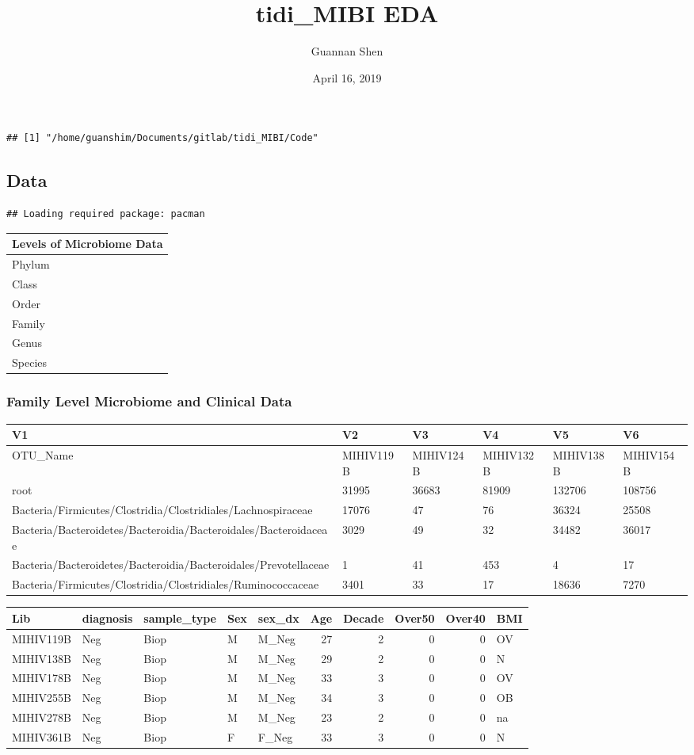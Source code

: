 \documentclass[]{article}
\title{tidi\_MIBI EDA}
\author{Guannan Shen}
\date{April 16, 2019}
\begin{document}
\maketitle

{
\setcounter{tocdepth}{5}
\tableofcontents
}
\begin{verbatim}
## [1] "/home/guanshim/Documents/gitlab/tidi_MIBI/Code"
\end{verbatim}

\subsection{Data}\label{data}

\begin{verbatim}
## Loading required package: pacman
\end{verbatim}

\begin{longtable}[]{@{}l@{}}
\toprule
Levels of Microbiome Data\tabularnewline
\midrule
\endhead
Phylum\tabularnewline
Class\tabularnewline
Order\tabularnewline
Family\tabularnewline
Genus\tabularnewline
Species\tabularnewline
\bottomrule
\end{longtable}

\subsubsection{Family Level Microbiome and Clinical
Data}\label{family-level-microbiome-and-clinical-data}

\begin{longtable}[]{@{}llllll@{}}
\toprule
V1 & V2 & V3 & V4 & V5 & V6\tabularnewline
\midrule
\endhead
OTU\_Name & MIHIV119B & MIHIV124B & MIHIV132B & MIHIV138B &
MIHIV154B\tabularnewline
root & 31995 & 36683 & 81909 & 132706 & 108756\tabularnewline
Bacteria/Firmicutes/Clostridia/Clostridiales/Lachnospiraceae & 17076 &
47 & 76 & 36324 & 25508\tabularnewline
Bacteria/Bacteroidetes/Bacteroidia/Bacteroidales/Bacteroidaceae & 3029 &
49 & 32 & 34482 & 36017\tabularnewline
Bacteria/Bacteroidetes/Bacteroidia/Bacteroidales/Prevotellaceae & 1 & 41
& 453 & 4 & 17\tabularnewline
Bacteria/Firmicutes/Clostridia/Clostridiales/Ruminococcaceae & 3401 & 33
& 17 & 18636 & 7270\tabularnewline
\bottomrule
\end{longtable}

\begin{longtable}[]{@{}lllllrrrrl@{}}
\toprule
Lib & diagnosis & sample\_type & Sex & sex\_dx & Age & Decade & Over50 &
Over40 & BMI\tabularnewline
\midrule
\endhead
MIHIV119B & Neg & Biop & M & M\_Neg & 27 & 2 & 0 & 0 & OV\tabularnewline
MIHIV138B & Neg & Biop & M & M\_Neg & 29 & 2 & 0 & 0 & N\tabularnewline
MIHIV178B & Neg & Biop & M & M\_Neg & 33 & 3 & 0 & 0 & OV\tabularnewline
MIHIV255B & Neg & Biop & M & M\_Neg & 34 & 3 & 0 & 0 & OB\tabularnewline
MIHIV278B & Neg & Biop & M & M\_Neg & 23 & 2 & 0 & 0 & na\tabularnewline
MIHIV361B & Neg & Biop & F & F\_Neg & 33 & 3 & 0 & 0 & N\tabularnewline
\bottomrule
\end{longtable}
\end{document}
